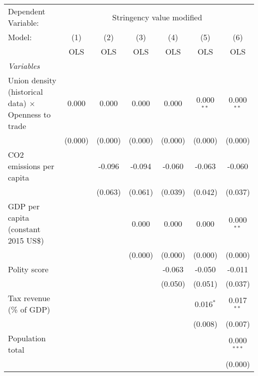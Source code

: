 
\begingroup
\centering
\begin{tabular}{lcccccc}
   \toprule
   Dependent Variable: & \multicolumn{6}{c}{Stringency value modified}\\
   Model:                                                      & (1)     & (2)     & (3)     & (4)     & (5)          & (6)\\  
                                                               &  OLS    & OLS     & OLS     & OLS     & OLS          & OLS\\  
   \midrule
   \emph{Variables}\\
   Union density (historical data) $\times$ Openness to trade  & 0.000   & 0.000   & 0.000   & 0.000   & 0.000$^{**}$ & 0.000$^{**}$\\   
                                                               & (0.000) & (0.000) & (0.000) & (0.000) & (0.000)      & (0.000)\\   
   CO2 emissions per capita                                    &         & -0.096  & -0.094  & -0.060  & -0.063       & -0.060\\   
                                                               &         & (0.063) & (0.061) & (0.039) & (0.042)      & (0.037)\\   
   GDP per capita (constant 2015 US\$)                         &         &         & 0.000   & 0.000   & 0.000        & 0.000$^{**}$\\   
                                                               &         &         & (0.000) & (0.000) & (0.000)      & (0.000)\\   
   Polity score                                                &         &         &         & -0.063  & -0.050       & -0.011\\   
                                                               &         &         &         & (0.050) & (0.051)      & (0.037)\\   
   Tax revenue (\% of GDP)                                     &         &         &         &         & 0.016$^{*}$  & 0.017$^{**}$\\   
                                                               &         &         &         &         & (0.008)      & (0.007)\\   
   Population total                                            &         &         &         &         &              & 0.000$^{***}$\\   
                                                               &         &         &         &         &              & (0.000)\\   

\end{tabular}
